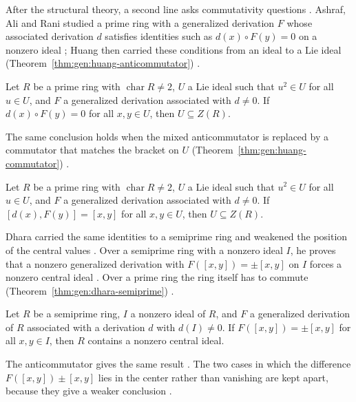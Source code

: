 After the structural theory, a second line asks commutativity questions
\cite[pp.~1--2]{Huang2007}.
Ashraf, Ali and Rani studied a prime ring with a generalized derivation $F$
whose associated derivation $d$ satisfies identities such as
$d(x)\circ F(y)=0$ on a nonzero ideal \cite[p.~1]{Huang2007}; Huang then
carried these conditions from an ideal to a Lie ideal (Theorem~\ref{thm:gen:huang-anticommutator})
\cite[p.~2]{Huang2007}.\begin{theorem}\label{thm:gen:huang-anticommutator}
Let $R$ be a prime ring with $\operatorname{char}R\neq 2$, $U$ a Lie ideal
such that $u^{2}\in U$ for all $u\in U$, and $F$ a generalized derivation
associated with $d\neq 0$. If $d(x)\circ F(y)=0$ for all $x,y\in U$, then
$U\subseteq Z(R)$.
\end{theorem}

The same conclusion holds when the mixed anticommutator is replaced by a
commutator that matches the bracket on $U$ (Theorem~\ref{thm:gen:huang-commutator}) \cite[p.~5]{Huang2007}.

\begin{theorem}\label{thm:gen:huang-commutator}
Let $R$ be a prime ring with $\operatorname{char}R\neq 2$, $U$ a Lie ideal
such that $u^{2}\in U$ for all $u\in U$, and $F$ a generalized derivation
associated with $d\neq 0$. If $[d(x),F(y)]=[x,y]$ for all $x,y\in U$, then
$U\subseteq Z(R)$.
\end{theorem}

Dhara carried the same identities to a semiprime ring and weakened the position
of the central values \cite[p.~1]{Dhara2010Remarks}. Over a semiprime ring with a
nonzero ideal $I$, he proves that a nonzero generalized derivation with
$F([x,y])=\pm[x,y]$ on $I$ forces a nonzero central ideal
\cite[Theorem~2.4, p.~2]{Dhara2010Remarks}. Over a prime ring the ring itself has to
commute (Theorem~\ref{thm:gen:dhara-semiprime}) \cite[Corollary~2.5, p.~3]{Dhara2010Remarks}.

\begin{theorem}\label{thm:gen:dhara-semiprime}
Let $R$ be a semiprime ring, $I$ a nonzero ideal of $R$, and $F$ a generalized
derivation of $R$ associated with a derivation $d$ with $d(I)\neq 0$. If
$F([x,y])=\pm[x,y]$ for all $x,y\in I$, then $R$ contains a nonzero central ideal.
\end{theorem}

The anticommutator gives the same result
\cite[Theorem~2.6, p.~3]{Dhara2010Remarks}. The two cases in which the difference
$F([x,y])\pm[x,y]$ lies in the center rather than vanishing are kept apart, because
they give a weaker conclusion
\cite[Theorem~2.8, p.~4]{Dhara2010Remarks}.


